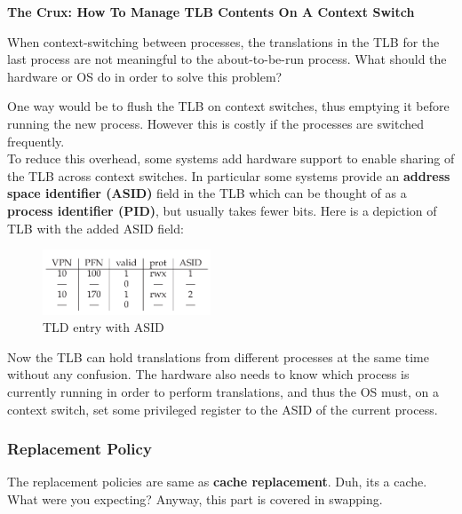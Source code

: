 \begin{tcolorbox}
    \begin{center}
        \textbf{The Crux: How To Manage TLB Contents On A Context Switch}
    \end{center}

    When context-switching between processes, the translations in the TLB
    for the last process are not meaningful to the about-to-be-run process.
    What should the hardware or OS do in order to solve this problem?
\end{tcolorbox}

One way would be to flush the TLB on context switches, thus emptying it before
running the new process. However this is costly if the processes are switched
frequently.\\

To reduce this overhead, some systems add hardware support to enable sharing of
the TLB across context switches. In particular some systems provide an
\textbf{address space identifier (ASID)} field in the TLB which can be thought
of as a \textbf{process identifier (PID)}, but usually takes fewer bits. Here
is a depiction of TLB with the added ASID field:

\begin{figure}[h!]
    \begin{center}
        \includegraphics[width=5cm]{img/ASID.png}
        \caption{TLD entry with ASID}
    \end{center}
\end{figure}

Now the TLB can hold translations from different processes at the same time
without any confusion. The hardware also needs to know which process is
currently running in order to perform translations, and thus the OS must, on 
a context switch, set some privileged register to the ASID of the current
process.

\subsubsection{Replacement Policy}

The replacement policies are same as \textbf{cache replacement}. Duh, its a
cache. What were you expecting? Anyway, this part is covered in swapping.

